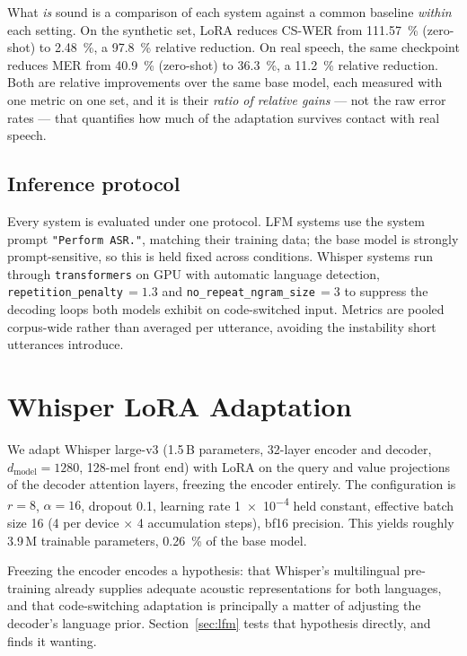 \documentclass[11pt,a4paper]{article}
\begin{document}
What \emph{is} sound is a comparison of each system against a common baseline
\emph{within} each setting. On the synthetic set, LoRA reduces CS-WER from
\SI{111.57}{\percent} (zero-shot) to \SI{2.48}{\percent}, a \SI{97.8}{\percent}
relative reduction. On real speech, the same checkpoint reduces MER from
\SI{40.9}{\percent} (zero-shot) to \SI{36.3}{\percent}, a \SI{11.2}{\percent}
relative reduction. Both are relative improvements over the same base model, each
measured with one metric on one set, and it is their \emph{ratio of relative
gains} --- not the raw error rates --- that quantifies how much of the adaptation
survives contact with real speech.

\subsection{Inference protocol}

Every system is evaluated under one protocol. LFM systems use the system prompt
\texttt{"Perform ASR."}, matching their training data; the base model is strongly
prompt-sensitive, so this is held fixed across conditions. Whisper systems run
through \texttt{transformers} on GPU with automatic language detection,
\texttt{repetition\_penalty}\,$=1.3$ and \texttt{no\_repeat\_ngram\_size}\,$=3$ to
suppress the decoding loops both models exhibit on code-switched input. Metrics
are pooled corpus-wide rather than averaged per utterance, avoiding the
instability short utterances introduce.

\section{Whisper LoRA Adaptation}
\label{sec:whisper}

We adapt Whisper large-v3 (1.5\,B parameters, 32-layer encoder
and decoder, $d_{\text{model}}=1280$, 128-mel front end) with LoRA on the query and
value projections of the decoder attention layers, freezing the encoder entirely.
The configuration is $r=8$, $\alpha=16$, dropout \num{0.1}, learning rate
\num{1e-4} held constant, effective batch size 16 (4 per device $\times$ 4
accumulation steps), bf16 precision. This yields roughly 3.9\,M
trainable parameters, \SI{0.26}{\percent} of the base model.

Freezing the encoder encodes a hypothesis: that Whisper's multilingual
pre-training already supplies adequate acoustic representations for both
languages, and that code-switching adaptation is principally a matter of adjusting
the decoder's language prior. Section~\ref{sec:lfm} tests that hypothesis
directly, and finds it wanting.
\end{document}
